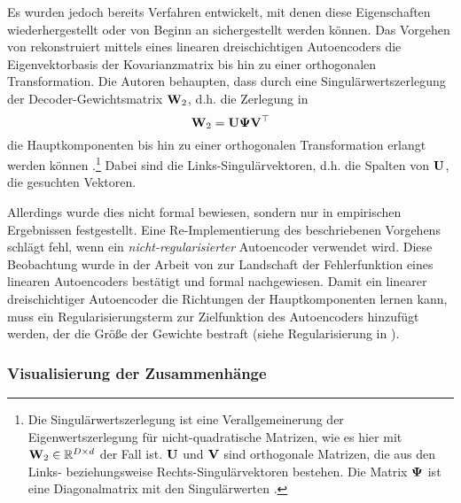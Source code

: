 Es wurden jedoch bereits Verfahren entwickelt, mit denen diese Eigenschaften wiederhergestellt oder
von Beginn an sichergestellt werden können. Das Vorgehen von \textcite{Plaut.2018} rekonstruiert
mittels eines linearen dreischichtigen Autoencoders die Eigenvektorbasis der Kovarianzmatrix bis
hin zu einer orthogonalen Transformation. Die Autoren behaupten, dass durch eine
Singulärwertszerlegung der Decoder-Gewichtsmatrix $\mathbf{W}_2$, d.h. die Zerlegung in
\begin{equation}
	\label{eq:SVD}
	\mathbf{W}_2 = \mathbf{U} \mathbf{\Psi} \mathbf{V}^\top
\end{equation}
die Hauptkomponenten bis hin zu einer orthogonalen Transformation erlangt werden können \parencite[4]{Plaut.2018}.\footnote{Die Singulärwertszerlegung ist eine Verallgemeinerung der
	Eigenwertszerlegung für nicht-quadratische Matrizen, wie es hier mit $\mathbf{W}_2 \in \mathbb{R}^{D \times
			d}$ der Fall ist. $\mathbf{U}$ und $\mathbf{V}$ sind orthogonale Matrizen, die aus den Links-
	beziehungsweise Rechts-Singulärvektoren bestehen. Die Matrix $\mathbf{\Psi}$ ist eine Diagonalmatrix
	mit den Singulärwerten \parencite[44 -- 45]{Goodfellow.2016}. } Dabei sind die Links-Singulärvektoren, d.h. die Spalten von
$\mathbf{U}$, die gesuchten Vektoren.

Allerdings wurde dies nicht formal bewiesen, sondern nur in empirischen Ergebnissen festgestellt.
Eine Re-Implementierung des beschriebenen Vorgehens schlägt fehl, wenn ein
\textit{nicht-regularisierter} Autoencoder verwendet wird. Diese Beobachtung wurde in der Arbeit
von \textcite{Kunin.2019} zur Landschaft der Fehlerfunktion eines linearen Autoencoders bestätigt
und formal nachgewiesen. Damit ein linearer dreischichtiger Autoencoder die Richtungen der
Hauptkomponenten lernen kann, muss ein Regularisierungsterm zur Zielfunktion des Autoencoders
hinzufügt werden, der die Größe der Gewichte bestraft (siehe Regularisierung in
).

\subsubsection{Visualisierung der Zusammenhänge}

